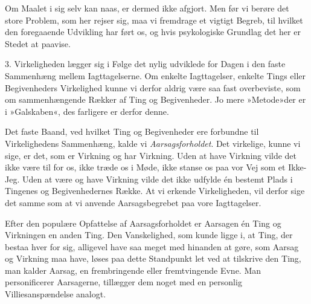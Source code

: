 \documentclass[12pt,a4paper,openany]{book}
\newcommand{\opage}[1]{\marginnote{\footnotesize\textit{[#1]}}}
\begin{document}
Om Maalet i sig selv kan naas, er dermed ikke afgjort. Men før vi berøre
det store Problem, som her rejser sig, maa vi fremdrage et vigtigt
Begreb, til hvilket den foregaaende Udvikling har ført os, og hvis
psykologiske Grundlag det her er Stedet at paavise.

3. Virkeligheden lægger sig i Følge det nylig udviklede for Dagen i den
faste Sammenhæng mellem Iagttagelserne. Om
\opage{255}enkelte Iagttagelser, enkelte Tings eller Begivenheders
Virkelighed kunne vi derfor aldrig være saa fast overbeviste, som om
sammenhængende Rækker af Ting og Begivenheder. Jo mere »Metode»der er i
»Galskaben«, des farligere er derfor denne.

Det faste Baand, ved hvilket Ting og Begivenheder ere forbundne til
Virkelighedens Sammenhæng, kalde vi \emph{Aarsagsforholdet}. Det
virkelige, kunne vi sige, er det, som er Virkning og har Virkning. Uden
at have Virkning vilde det ikke være til for os, ikke træde os i Møde,
ikke stanse os paa vor Vej som et Ikke-Jeg. Uden at være og have
Virkning vilde det ikke udfylde én bestemt Plads i Tingenes og
Begivenhedernes Række. At vi erkende Virkeligheden, vil derfor sige det
samme som at vi anvende Aarsagsbegrebet paa vore Iagttagelser.

Efter den populære Opfattelse af Aarsagsforholdet er Aarsagen én Ting og
Virkningen en anden Ting. Den Vanskelighed, som kunde ligge i, at Ting,
der bestaa hver for sig, alligevel have saa meget med hinanden at gøre,
som Aarsag og Virkning maa have, løses paa dette Standpunkt let ved at
tilskrive den Ting, man kalder Aarsag, en frembringende eller
fremtvingende Evne. Man personificerer Aarsagerne, tillægger dem noget
med en personlig Villiesanspændelse analogt.
\end{document}
